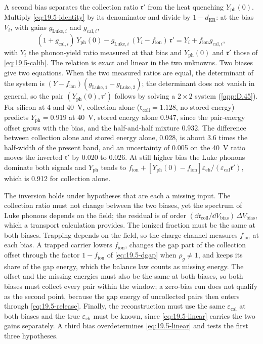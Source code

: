 A second bias separates the collection ratio $\mathfrak{r}'$ from the heat quenching $Y_{\mathrm{ph}}(0)$. Multiply \cref{eq:19.5-identity} by its denominator and divide by $1 - d_{\mathrm{ER}}$: at the bias $V_i$, with gains $g_{\mathrm{Luke},i}$ and $g_{\mathrm{cal},i}$,
\begin{equation}
  (1 + g_{\mathrm{cal},i})\,Y_{\mathrm{ph}}(0) - g_{\mathrm{Luke},i}\,(Y_i - f_{\mathrm{ion}})\,\mathfrak{r}' = Y_i + f_{\mathrm{ion}}g_{\mathrm{cal},i} ,
  \label{eq:19.5-linear}
\end{equation}
with $Y_i$ the phonon-yield ratio measured at that bias and $Y_{\mathrm{ph}}(0)$ and $\mathfrak{r}'$ those of \cref{eq:19.5-calib}. The relation is exact and linear in the two unknowns. Two biases give two equations. When the two measured ratios are equal, the determinant of the system is $(Y - f_{\mathrm{ion}})(g_{\mathrm{Luke},1} - g_{\mathrm{Luke},2})$; the determinant does not vanish in general, so the pair $(Y_{\mathrm{ph}}(0), \mathfrak{r}')$ follows by solving a $2\times2$ system (\cref{app:D.45}). For silicon at 4 and \SI{40}{V}, collection alone ($\mathfrak{r}_{\mathrm{coll}} = 1.128$, no stored energy) predicts $Y_{\mathrm{ph}} = 0.919$ at \SI{40}{V}, stored energy alone 0.947, since the pair-energy offset grows with the bias, and the half-and-half mixture 0.932. The difference between collection alone and stored energy alone, 0.028, is about 3.6 times the half-width of the present band, and an uncertainty of 0.005 on the \SI{40}{V} ratio moves the inverted $\mathfrak{r}'$ by 0.020 to 0.026. At still higher bias the Luke phonons dominate both signals and $Y_{\mathrm{ph}}$ tends to $f_{\mathrm{ion}} + [Y_{\mathrm{ph}}(0) - f_{\mathrm{ion}}]\varepsilon_{\mathrm{eh}}/(\varepsilon_{\mathrm{cal}}\mathfrak{r}')$, which is 0.912 for collection alone.

The inversion holds under hypotheses that are each a missing input. The collection ratio must not change between the two biases, yet the spectrum of Luke phonons depends on the field; the residual is of order $(\dd\mathfrak{r}_{\mathrm{coll}}/\dd V_{\mathrm{bias}})\,\Delta V_{\mathrm{bias}}$, which a transport calculation provides. The ionized fraction must be the same at both biases. Trapping depends on the field, so the charge channel measures $f_{\mathrm{ion}}$ at each bias. A trapped carrier lowers $f_{\mathrm{ion}}$, changes the gap part of the collection offset through the factor $1 - f_{\mathrm{ion}}$ of \cref{eq:19.5-dgap} when $\rho_g \neq 1$, and keeps its share of the gap energy, which the balance law counts as missing energy. The offset and the missing energies must also be the same at both biases, so both biases must collect every pair within the window; a zero-bias run does not qualify as the second point, because the gap energy of uncollected pairs then enters through \cref{eq:19.5-release}. Finally, the reconstruction must use the same $\varepsilon_{\mathrm{cal}}$ at both biases and the true $\varepsilon_{\mathrm{eh}}$ must be known, since \cref{eq:19.5-linear} carries the two gains separately. A third bias overdetermines \cref{eq:19.5-linear} and tests the first three hypotheses.

